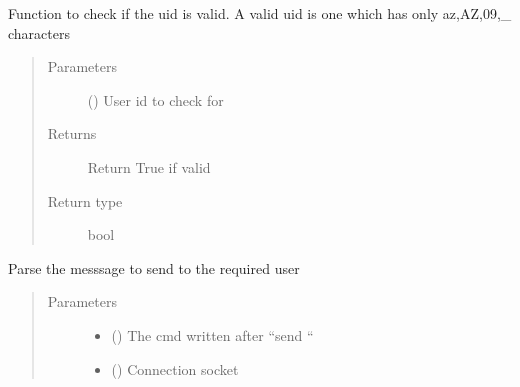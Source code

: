 \documentclass[letterpaper,10pt,english]{sphinxmanual}
\begin{document}
\begin{fulllineitems}
\label{\detokenize{userInputHandler:userInputHandler.checkValidityOfUID}}
Function to check if the uid is valid. A valid uid is one which has only a\sphinxhyphen{}z,A\sphinxhyphen{}Z,0\sphinxhyphen{}9,\_ characters
\begin{quote}\begin{description}
\item[{Parameters}] \leavevmode
{} () \textendash{} User id to check for

\item[{Returns}] \leavevmode
Return True if valid

\item[{Return type}] \leavevmode
bool

\end{description}\end{quote}

\end{fulllineitems}


\begin{fulllineitems}
\label{\detokenize{userInputHandler:userInputHandler.sendMessage}}
Parse the messsage to send to the required user
\begin{quote}\begin{description}
\item[{Parameters}] \leavevmode\begin{itemize}
\item {} 
 () \textendash{} The cmd written after “send “

\item {} 
 () \textendash{} Connection socket

\end{itemize}

\end{description}\end{quote}

\end{fulllineitems}
\end{document}
